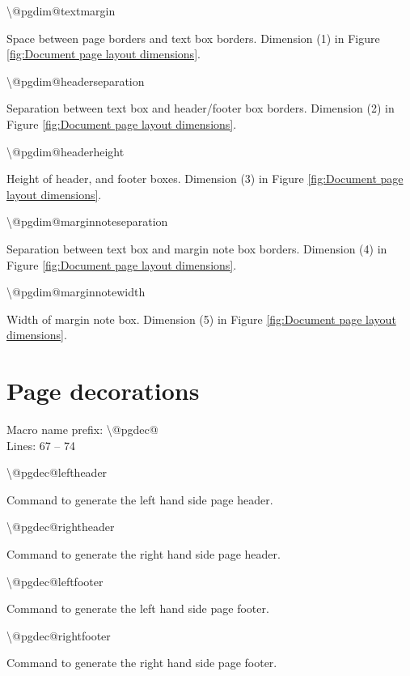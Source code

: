 \documentclass[twoside,openany]{thesis}
\begin{document}
\begin{listing}

\item   {\ttfamily\textbackslash @pgdim@textmargin}

        Space between page borders and text box borders.
        Dimension (1) in Figure \ref{fig:Document page layout dimensions}.

\item   {\ttfamily\textbackslash @pgdim@headerseparation}

        Separation between text box and header/footer box borders.
        Dimension (2) in Figure \ref{fig:Document page layout dimensions}.

\item   {\ttfamily\textbackslash @pgdim@headerheight}

        Height of header, and footer boxes.
        Dimension (3) in Figure \ref{fig:Document page layout dimensions}.

\item   {\ttfamily\textbackslash @pgdim@marginnoteseparation}

        Separation between text box and margin note box borders.
        Dimension (4) in Figure \ref{fig:Document page layout dimensions}.

\item   {\ttfamily\textbackslash @pgdim@marginnotewidth}

        Width of margin note box.
        Dimension (5) in Figure \ref{fig:Document page layout dimensions}.

\end{listing}

\section{Page decorations}\label{sec:Page decorations}

Macro name prefix: {\ttfamily\textbackslash @pgdec@}\\
Lines: 67 -- 74

\begin{listing}

\item   {\ttfamily\textbackslash @pgdec@leftheader}

        Command to generate the left hand side page header.

\item   {\ttfamily\textbackslash @pgdec@rightheader}

        Command to generate the right hand side page header.

\item   {\ttfamily\textbackslash @pgdec@leftfooter}

        Command to generate the left hand side page footer.

\item   {\ttfamily\textbackslash @pgdec@rightfooter}

        Command to generate the right hand side page footer.

\end{listing}
\end{document}
